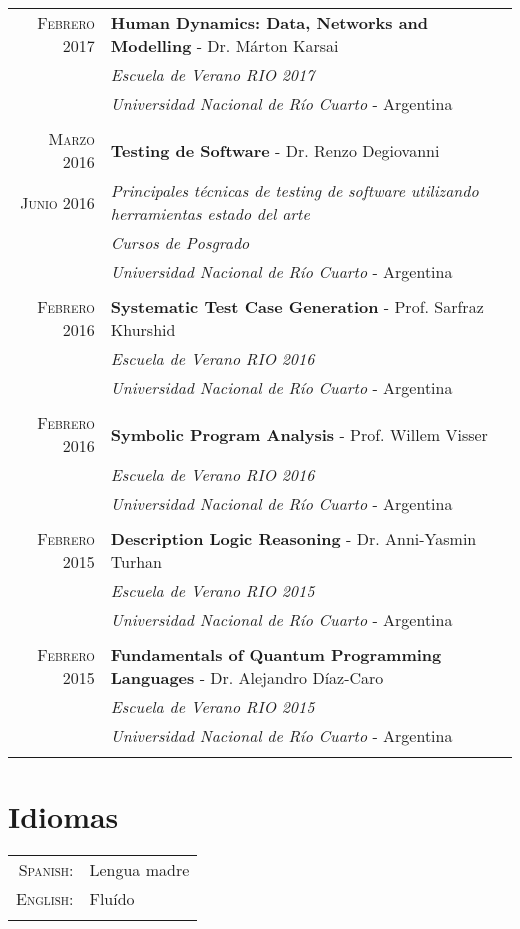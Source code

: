 \documentclass[a4paper,10pt]{article} %
\begin{document}
\begin{longtable}{rl}
\textsc{Febrero} 2017 & \textbf{Human Dynamics: Data, Networks and Modelling} - Dr. Márton Karsai \\
& \textit{Escuela de Verano RIO 2017} \\
& \textit{Universidad Nacional de Río Cuarto} - Argentina \\ & \\

\textsc{Marzo} 2016 & \textbf{Testing de Software} - Dr. Renzo Degiovanni \\
\textsc{Junio} 2016 & \textit{Principales técnicas de testing de software utilizando herramientas estado del arte} \\
& \textit{Cursos de Posgrado} \\
& \textit{Universidad Nacional de Río Cuarto} - Argentina \\ & \\

\textsc{Febrero} 2016 & \textbf{Systematic Test Case Generation} - Prof. Sarfraz Khurshid \\
& \textit{Escuela de Verano RIO 2016} \\
& \textit{Universidad Nacional de Río Cuarto} - Argentina \\ & \\

\textsc{Febrero} 2016 & \textbf{Symbolic Program Analysis} - Prof. Willem Visser \\
& \textit{Escuela de Verano RIO 2016} \\
& \textit{Universidad Nacional de Río Cuarto} - Argentina \\ & \\

\textsc{Febrero} 2015 & \textbf{Description Logic Reasoning} - Dr. Anni-Yasmin Turhan\\
& \textit{Escuela de Verano RIO 2015} \\
& \textit{Universidad Nacional de Río Cuarto} - Argentina \\ & \\

\textsc{Febrero} 2015 & \textbf{Fundamentals of Quantum Programming Languages} - Dr. Alejandro Díaz-Caro \\
& \textit{Escuela de Verano RIO 2015} \\
& \textit{Universidad Nacional de Río Cuarto} - Argentina \\ & \\

\end{longtable}

\section{Idiomas}
\begin{tabular}{rl}
\\
\textsc{Spanish:} & Lengua madre\\
\textsc{English:} & Fluído \\ & \\
\end{tabular}
\end{document}
